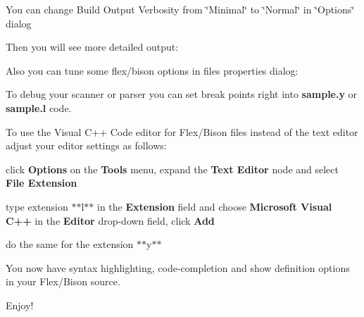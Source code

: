 You can change Build Output Verbosity from \char`\"{}\+Minimal\char`\"{} to \char`\"{}\+Normal\char`\"{} in \char`\"{}\+Options\char`\"{} dialog



Then you will see more detailed output\+:


\begin{DoxyCode}{0}
\end{DoxyCode}




Also you can tune some flex/bison options in files properties dialog\+:

  



To debug your scanner or parser you can set break points right into {\bfseries{sample.\+y}} or {\bfseries{sample.\+l}} code.





To use the Visual C++ Code editor for Flex/\+Bison files instead of the text editor adjust your editor settings as follows\+:


\begin{DoxyItemize}
\item click {\bfseries{Options}} on the {\bfseries{Tools}} menu, expand the {\bfseries{Text Editor}} node and select {\bfseries{File Extension}}
\item type extension $\ast$$\ast${\ttfamily l}$\ast$$\ast$ in the {\bfseries{Extension}} field and choose {\bfseries{Microsoft Visual C++}} in the {\bfseries{Editor}} drop-\/down field, click {\bfseries{Add}}
\item do the same for the extension $\ast$$\ast${\ttfamily y}$\ast$$\ast$
\end{DoxyItemize}

You now have syntax highlighting, code-\/completion and show definition options in your Flex/\+Bison source.



Enjoy! 